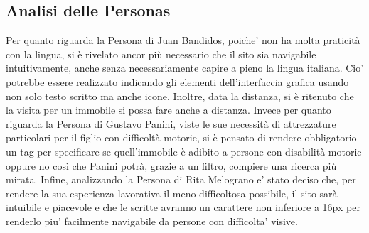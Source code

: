     \subsection{Analisi delle Personas}
    Per quanto riguarda la Persona di Juan Bandidos, poiche' non ha molta praticità con la lingua, si è rivelato ancor più necessario che il sito sia navigabile intuitivamente, anche senza necessariamente capire a pieno la lingua italiana. Cio' potrebbe essere realizzato indicando gli elementi dell'interfaccia grafica usando non solo testo scritto ma anche icone. Inoltre, data la distanza, si è ritenuto che la visita per un immobile si possa fare anche a distanza.
    \newline
    Invece per quanto riguarda la Persona di Gustavo Panini, viste le sue necessità di attrezzature particolari per il figlio con difficoltà motorie, si è pensato di rendere obbligatorio un tag per specificare se quell'immobile è adibito a persone con disabilità motorie oppure no così che Panini potrà, grazie a un filtro, compiere una ricerca più mirata.
    \newline
    Infine, analizzando la Persona di Rita Melograno e' stato deciso che, per rendere la sua esperienza lavorativa il meno difficoltosa possibile, il sito sarà intuibile e piacevole e che le scritte avranno un carattere non inferiore a 16px per renderlo piu' facilmente navigabile da persone con difficolta' visive.
\hfill



